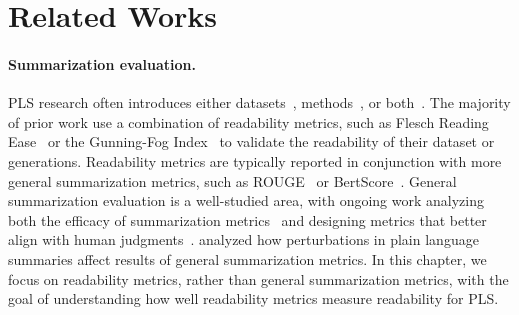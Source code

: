 \section{Related Works}


\paragraph{Summarization evaluation.} PLS research often introduces either datasets~\cite{goldsack2022making,Crossley2021TheCE,cardenas2024scinews,Manor2019PlainES}, methods~\cite{Guo2022RetrievalAO,August2022GeneratingSD,luo2022readability,ji-etal-2024-rag,flores-etal-2023-medical}, or both~\cite{Guo2020AutomatedLL,Zaman2020HTSSAN,chandrasekaran2020overview}. The majority of prior work use a combination of readability metrics, such as Flesch Reading Ease~\cite{Flesch1943MarksOR} or the Gunning-Fog Index~\cite{Gunning1968TheTO} to validate the readability of their dataset or generations. Readability metrics are typically reported in conjunction with more general summarization metrics, such as ROUGE~\cite{lin2004rouge} or BertScore~\cite{zhang2020bertscore}. General summarization evaluation is a well-studied area, with ongoing work analyzing both the efficacy of summarization metrics~\cite{fabbri2021summeval,khashabi2022genie,goyal2022news} and designing metrics that better align with human judgments~\cite{liu-etal-2023-towards-interpretable,Liu2022RevisitingTG}. \textcite{guo-etal-2024-appls} analyzed how perturbations in plain language summaries affect results of general summarization metrics. In this chapter, we focus on readability metrics, rather than general summarization metrics, with the goal of understanding how well readability metrics measure readability for PLS.

